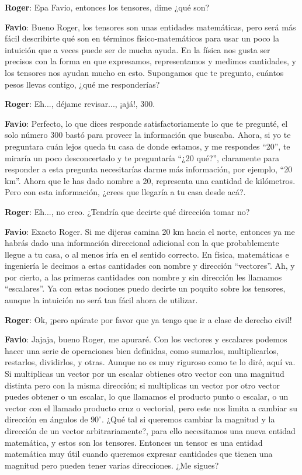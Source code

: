 \documentclass[a4paper,10pt]{article}
\numberwithin{equation}{section}
\begin{document}
\vspace{.3cm}

\textbf{\color{ForestGreen}Roger}: Epa Favio, entonces los tensores, dime ¿qué son?

\textbf{\color{Blue}Favio}: Bueno Roger, los tensores son unas entidades matemáticas, pero
será más fácil describirte qué son en términos físico-matemáticos para usar un poco la 
intuición que a veces puede ser de mucha ayuda. En la física nos gusta ser precisos con 
la forma en que expresamos, representamos y medimos cantidades, y los tensores nos ayudan
mucho en esto. Supongamos que te pregunto, cuántos pesos llevas contigo, ¿qué me responderías?

\textbf{\color{ForestGreen}Roger}: Eh..., déjame revisar..., ¡ajá!, 300.

\textbf{\color{Blue}Favio}: Perfecto, lo que dices responde satisfactoriamente lo que te 
pregunté, el solo número 300 bastó para proveer la información que buscaba. Ahora, si yo
te preguntara cuán lejos queda tu casa de donde estamos, y me respondes ``20'', te miraría
un poco desconcertado y te preguntaría ``¿20 qué?'', claramente para responder a esta 
pregunta necesitarías darme más información, por ejemplo, ``20 km''. Ahora que le has 
dado nombre a 20, representa una cantidad de kilómetros. Pero con esta información, 
¿crees que llegaría a tu casa desde acá?.

\textbf{\color{ForestGreen}Roger}: Eh..., no creo. ¿Tendría que decirte qué dirección tomar no?

\textbf{\color{Blue}Favio}: Exacto Roger. Si me dijeras camina 20 km hacia el norte, entonces 
ya me habrás dado una información direccional adicional con la que probablemente llegue a tu casa,
o al menos iría en el sentido correcto. En física, matemáticas e ingeniería le decimos 
a estas cantidades con nombre y dirección ``vectores''. Ah, y por cierto, a las primeras 
cantidades con nombre y sin dirección les llamamos ``escalares''. Ya con estas nociones 
puedo decirte un poquito sobre los tensores, aunque la intuición no será tan fácil
ahora de utilizar.

\textbf{\color{ForestGreen}Roger}: Ok, ¡pero apúrate por favor que ya tengo que ir a clase de 
derecho civil!

\textbf{\color{Blue}Favio}: Jajaja, bueno Roger, me apuraré. Con los vectores y escalares
podemos hacer una serie de operaciones bien definidas, como sumarlos, multiplicarlos, restarlos,
dividirlos, y otras. Aunque no es muy riguroso como te lo diré, aquí va. Si multiplicas 
un vector por un escalar obtienes otro vector con una magnitud distinta pero con 
la misma dirección; si multiplicas un vector por otro vector puedes obtener o un escalar,
lo que llamamos el producto punto o escalar, o un vector con el llamado producto cruz o 
vectorial, pero este nos limita a cambiar su dirección en ángulos de $90^\circ$. ¿Qué tal 
si queremos cambiar la magnitud y la dirección de un vector arbitrariamente?, para ello
necesitamos una nueva entidad matemática, y estos son los tensores. Entonces un tensor 
es una entidad matemática muy útil cuando queremos expresar cantidades que tienen una 
magnitud pero pueden tener varias direcciones. ¿Me sigues?
\end{document}
